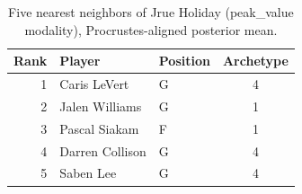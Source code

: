 \begin{table}[htbp]
  \centering\small
  \begin{tabular}{rllc}
    \toprule
    Rank & Player & Position & Archetype \\
    \midrule
    1 & Caris LeVert & G & 4 \\
    2 & Jalen Williams & G & 1 \\
    3 & Pascal Siakam & F & 1 \\
    4 & Darren Collison & G & 4 \\
    5 & Saben Lee & G & 4 \\
    \bottomrule
  \end{tabular}
  \caption{Five nearest neighbors of Jrue Holiday (peak_value modality), Procrustes-aligned posterior mean.}
  \label{tab:Jrue_Holiday_neighbors_peak_value}
\end{table}

